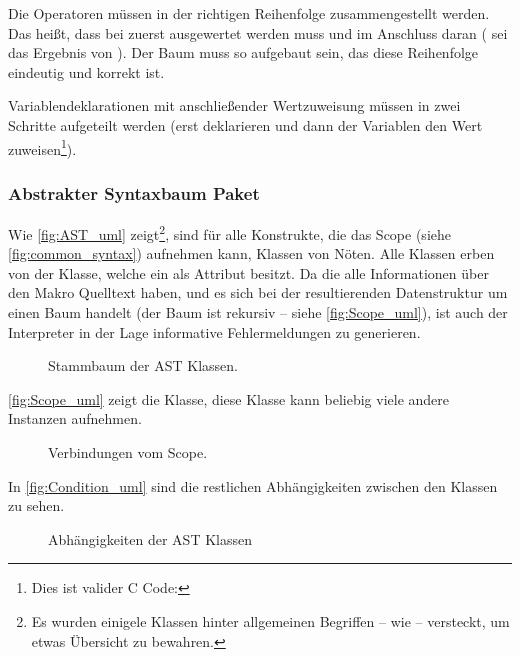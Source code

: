       Die Operatoren müssen in der richtigen Reihenfolge zusammengestellt werden. Das heißt, dass bei  zuerst  ausgewertet werden muss und im Anschluss daran  ( sei das Ergebnis von ). Der Baum muss so aufgebaut sein, das diese Reihenfolge eindeutig und korrekt ist.

      Variablendeklarationen mit anschließender Wertzuweisung müssen in zwei Schritte aufgeteilt werden (erst deklarieren und dann der Variablen den Wert zuweisen\footnote{
        Dies ist valider C Code: 
      }).

    \subsubsection{Abstrakter Syntaxbaum Paket}
    \label{sssec:Abstrakter Syntaxbaum Paket}
      Wie \autoref{fig:AST_uml} zeigt\footnote{
        Es wurden einigele Klassen hinter allgemeinen Begriffen -- wie  -- versteckt, um etwas Übersicht zu bewahren.
      }, sind für alle Konstrukte, die das Scope (siehe \autoref{fig:common_syntax}) aufnehmen kann, Klassen von Nöten. Alle Klassen erben von der  Klasse, welche ein  als Attribut besitzt. Da die  alle Informationen über den Makro Quelltext haben, und es sich bei der resultierenden Datenstruktur um einen Baum handelt (der Baum ist rekursiv -- siehe \autoref{fig:Scope_uml}), ist auch der Interpreter in der Lage informative Fehlermeldungen zu generieren.
      \begin{figure}[H]
        \centering
        \caption{Stammbaum der AST Klassen.}
        \label{fig:AST_uml}
      \end{figure}

      \autoref{fig:Scope_uml} zeigt die  Klasse, diese Klasse kann beliebig viele andere  Instanzen aufnehmen.
      \begin{figure}[H]
        \centering
        \caption{Verbindungen vom Scope.}
        \label{fig:Scope_uml}
      \end{figure}

      In \autoref{fig:Condition_uml} sind die restlichen Abhängigkeiten zwischen den  Klassen zu sehen.
      \begin{figure}[H]
        \centering
        \caption{Abhängigkeiten der AST Klassen}
        \label{fig:Condition_uml}
      \end{figure}

